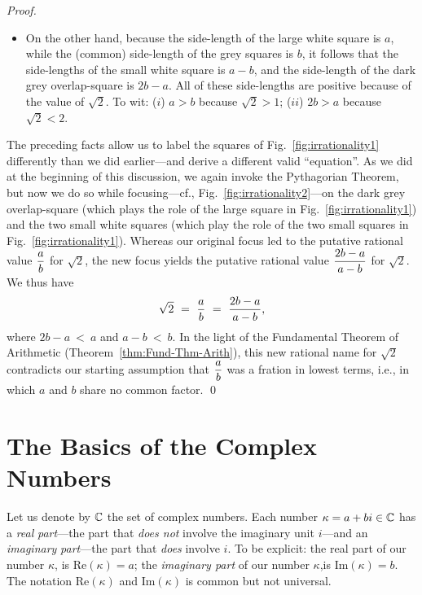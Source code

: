 \begin{proof}
\begin{itemize}
\item
On the other hand, because the side-length of the large white square
is $a$, while the (common) side-length of the grey squares is $b$, it
follows that the side-lengths of the small white square is $a-b$, and
the side-length of the dark grey overlap-square is $2b-a$.  All of
these side-lengths are positive because of the value of $\sqrt{2}$.
To wit: ($i$) $a > b$ because $\sqrt{2} >1$; ($ii$) $2b >a$ because
$\sqrt{2} < 2$.
\end{itemize}
The preceding facts allow us to label the squares of
Fig.~\ref{fig:irrationality1} differently than we did earlier---and
derive a different valid ``equation''.  As we did at the beginning of
this discussion, we again invoke the Pythagorian Theorem, but now we
do so while focusing---cf., Fig.~\ref{fig:irrationality2}---on the
dark grey overlap-square (which plays the role of the large square in
Fig.~\ref{fig:irrationality1}) and the two small white squares (which
play the role of the two small squares in
Fig.~\ref{fig:irrationality1}).  Whereas our original focus led to the
putative rational value $\displaystyle {a \over b}$ for $\sqrt{2}$,
the new focus yields the putative rational value $\displaystyle {2b-a
  \over a-b}$ for $\sqrt{2}$.  We thus have
\[ \sqrt{2} \ = \ {a \over b} \ = \ {2b-a \over a-b}, \]
where $2b-a \ < \ a$ and $a-b \ < \ b$.  In the light of the
Fundamental Theorem of Arithmetic (Theorem~\ref{thm:Fund-Thm-Arith}),
this new rational name for $\sqrt{2}$ contradicts our starting
assumption that $\displaystyle {a \over b}$ was a fration in lowest
terms, i.e., in which $a$ and $b$ share no common factor. %
\qed
\end{proof}



\section{The Basics of the Complex Numbers}
\label{sec:complexes}

Let us denote by $\mathbb{C}$ the set of complex numbers.  Each number $\kappa
= a+bi \in \mathbb{C}$ has a {\it real}  {\em
  part}---the part that {\em does not} involve the imaginary unit
 $i$---and an {\it imaginary}
 {\em part}---the part that {\em
  does} involve $i$.  To be explicit: the real part of our number
$\kappa$, is  Re$(\kappa)
= a$; the {\it imaginary part} of our number $\kappa$,is
 Im$(\kappa) = b$.
 The notation
Re$(\kappa)$ and Im$(\kappa)$ is common but not universal.

